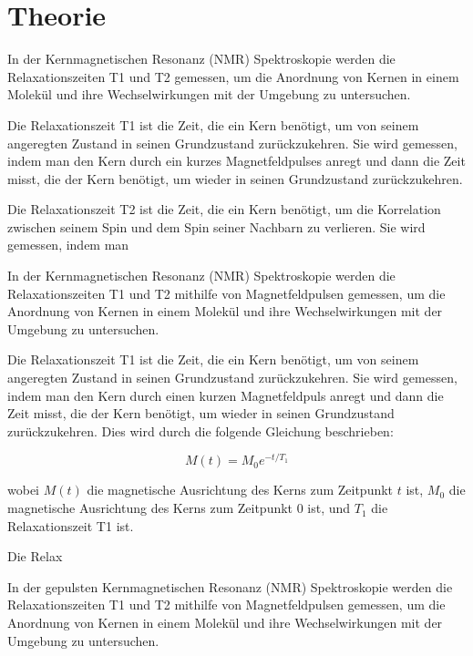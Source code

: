 \section{Theorie}
\label{sec:Theorie}



In der Kernmagnetischen Resonanz (NMR) Spektroskopie werden die 
Relaxationszeiten T1 und T2 gemessen, um die Anordnung von Kernen 
in einem Molekül und ihre Wechselwirkungen mit der Umgebung zu untersuchen.

Die Relaxationszeit T1 ist die Zeit, die ein Kern benötigt, um von
seinem angeregten Zustand in seinen Grundzustand zurückzukehren. 
Sie wird gemessen, indem man den Kern durch ein kurzes Magnetfeldpulses
 anregt und dann die Zeit misst, die der Kern benötigt, um wieder in 
 seinen Grundzustand zurückzukehren.

Die Relaxationszeit T2 ist die Zeit, die ein Kern benötigt, um die 
Korrelation zwischen seinem Spin und dem Spin seiner Nachbarn zu 
verlieren. Sie wird gemessen, indem man





In der Kernmagnetischen Resonanz (NMR) Spektroskopie werden die 
Relaxationszeiten T1 und T2 mithilfe von Magnetfeldpulsen gemessen, 
um die Anordnung von Kernen in einem Molekül und ihre 
Wechselwirkungen mit der Umgebung zu untersuchen.

Die Relaxationszeit T1 ist die Zeit, die ein Kern benötigt, um 
von seinem angeregten Zustand in seinen Grundzustand zurückzukehren. 
Sie wird gemessen, indem man den Kern durch einen kurzen Magnetfeldpuls 
anregt und dann die Zeit misst, die der Kern benötigt, um wieder 
in seinen Grundzustand zurückzukehren. Dies wird durch die 
folgende Gleichung beschrieben:

\begin{equation}
    M(t) = M_0 e^{-t/T_1}
\end{equation}

wobei $M(t)$ die magnetische Ausrichtung des Kerns zum 
Zeitpunkt $t$ ist, $M_0$ die magnetische Ausrichtung des Kerns zum Zeitpunkt 0 ist, und $T_1$ die Relaxationszeit T1 ist.

Die Relax



In der gepulsten Kernmagnetischen Resonanz (NMR) 
Spektroskopie werden die Relaxationszeiten T1 und T2 mithilfe
 von Magnetfeldpulsen gemessen, um die Anordnung von Kernen in einem Molekül und ihre Wechselwirkungen mit der Umgebung zu untersuchen.

